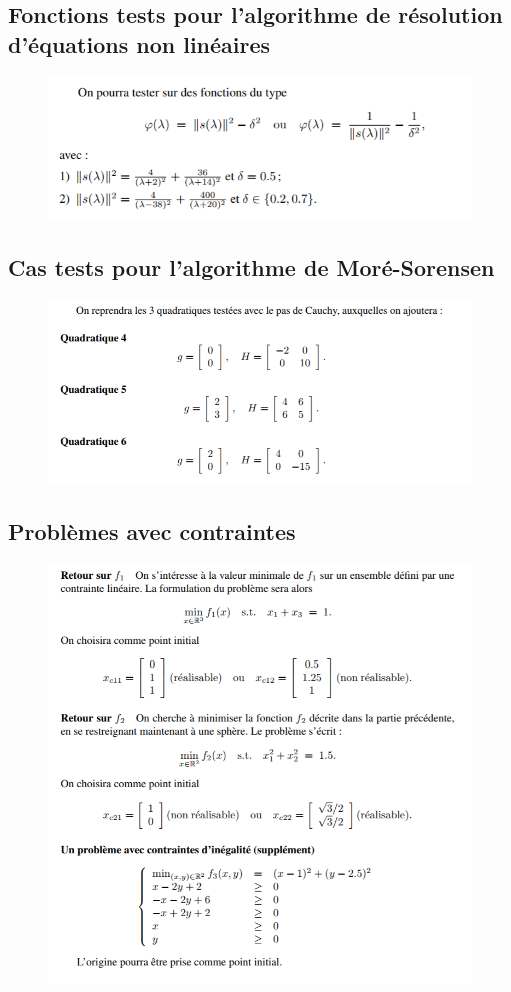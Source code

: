 \documentclass[a4paper,12pt]{article}
\theoremstyle{break}
\begin{document}
\subsection{Fonctions tests pour l'algorithme de résolution d'équations non linéaires}
\begin{figure}[htbp]
	\centering
		\includegraphics{img/tests_newton_non_lineaire.PNG}
\end{figure}


\subsection{Cas tests pour l'algorithme de Moré-Sorensen}
\begin{figure}[htbp]
	\centering
		\includegraphics{img/cas_tests_more_sorensen.PNG}
\end{figure}

\newpage

\subsection{Problèmes avec contraintes}
\begin{figure}[htbp]
	\centering
		\includegraphics{img/problemes_avec_contraintes.PNG}
\end{figure}
\end{document}
